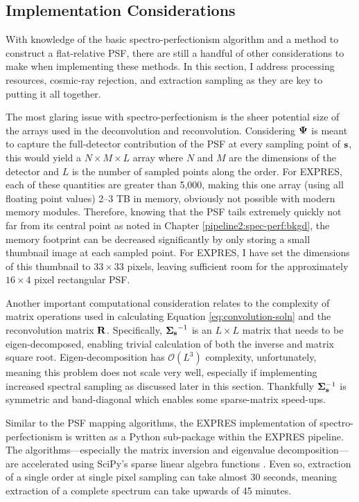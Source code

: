 \subsection{Implementation Considerations} \label{pipeline2:spec-perf:implement}

With knowledge of the basic spectro-perfectionism algorithm and a method to construct a flat-relative PSF, there are still a handful of other considerations to make when implementing these methods. In this section, I address processing resources, cosmic-ray rejection, and extraction sampling as they are key to putting it all together.

The most glaring issue with spectro-perfectionism is the sheer potential size of the arrays used in the deconvolution and reconvolution. Considering $\vb{\Psi}$ is meant to capture the full-detector contribution of the PSF at every sampling point of $\vb{s}$, this would yield a $N \times M \times L$ array where $N$ and $M$ are the dimensions of the detector and $L$ is the number of sampled points along the order. For EXPRES, each of these quantities are greater than 5,000, making this one array (using all floating point values) 2--3 TB in memory, obviously not possible with modern memory modules. Therefore, knowing that the PSF tails extremely quickly not far from its central point as noted in Chapter \ref{pipeline2:spec-perf:bkgd}, the memory footprint can be decreased significantly by only storing a small thumbnail image at each sampled point. For EXPRES, I have set the dimensions of this thumbnail to $33 \times 33$ pixels, leaving sufficient room for the approximately $16 \times 4$ pixel rectangular PSF.

Another important computational consideration relates to the complexity of matrix operations used in calculating Equation \ref{eq:convolution-soln} and the reconvolution matrix $\vb{R}$. Specifically, $\vb{\Sigma_s}^{-1}$ is an $L \times L$ matrix that needs to be eigen-decomposed, enabling trivial calculation of both the inverse and matrix square root. Eigen-decomposition has $\mathcal{O}(L^3)$ complexity, unfortunately, meaning this problem does not scale very well, especially if implementing increased spectral sampling as discussed later in this section. Thankfully $\vb{\Sigma}_{\vb{s}}^{-1}$ is symmetric and band-diagonal which enables some sparse-matrix speed-ups.

Similar to the PSF mapping algorithms, the EXPRES implementation of spectro-per\-fectionism is written as a Python sub-package within the EXPRES pipeline. The algori\-thms---especially the matrix inversion and eigenvalue decomposition---are accelerated using SciPy's sparse linear algebra functions \citep{virtanen_scipy_2020}. Even so, extraction of a single order at single pixel sampling can take almost 30 seconds, meaning extraction of a complete spectrum can take upwards of 45 minutes.

